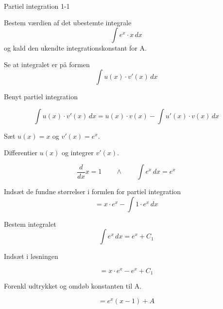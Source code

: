 \documentclass{article}
\begin{document}
\tableofcontents



\begin{exercise}{Partiel integration 1-1}


Bestem værdien af det ubestemte integrale
\[
\int e^x \cdot x \, dx
\]
og kald den ukendte integrationskonstant for A.



\hint

Se at integralet er på formen
\[
\int u(x) \cdot v'(x) \, dx
\]

\hint

Benyt partiel integration

\hint
\[
\int u(x) \cdot v'(x)\, dx = u(x) \cdot v(x) - \int u'(x) \cdot v(x) \, dx
\]
\hint

Sæt $u(x) = x$ og $v'(x) = e^x$.


\hint

Differentier $u(x)$ og integrer $v'(x)$.

\hint
\[
\frac{d}{dx}x = 1 \qquad \wedge \qquad \int e^x \, dx = e^x
\]

\hint

Indsæt de fundne størrelser i formlen for partiel integration
\[
= x \cdot e^x - \int 1 \cdot e^x \, dx
\]

\hint

Bestem integralet
\[
\int e^x \, dx = e^x + C_1
\]

\hint
Indsæt i løsningen

\hint

\[
= x \cdot e^x - e^x + C_1
\]

\hint

Forenkl udtrykket og omdøb konstanten til A.

\hint

\[
= e^x(x - 1) + A
\]


\end{exercise}

\newpage
\end{document}
